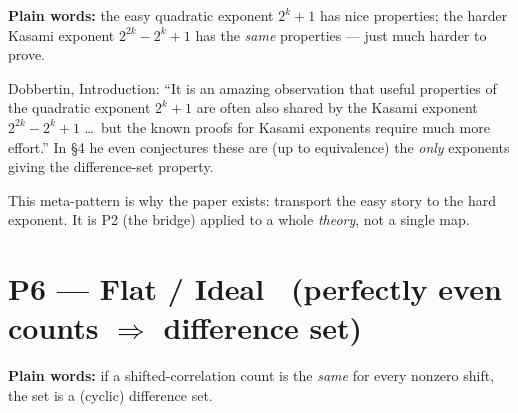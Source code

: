 \documentclass[11pt]{article}
\begin{document}
\textbf{Plain words:} the easy quadratic exponent $2^k+1$ has nice properties;
the harder Kasami exponent $2^{2k}-2^k+1$ has the \emph{same} properties --- just
much harder to prove.

\begin{center}
\end{center}

\begin{remarkbox}
Dobbertin, Introduction: ``It is an amazing observation that useful properties
of the quadratic exponent $2^k+1$ are often also shared by the Kasami exponent
$2^{2k}-2^k+1$ \dots\ but the known proofs for Kasami exponents require much more
effort.'' In {\S}4 he even conjectures these are (up to equivalence) the
\emph{only} exponents giving the difference-set property.
\end{remarkbox}

\begin{coolfact}
This meta-pattern is why the paper exists: transport the easy story to the hard
exponent. It is P2 (the bridge) applied to a whole \emph{theory}, not a single map.
\end{coolfact}

\section{P6 --- Flat / Ideal \ (perfectly even counts $\Rightarrow$ difference set)}

\textbf{Plain words:} if a shifted-correlation count is the \emph{same} for every
nonzero shift, the set is a (cyclic) difference set.
\end{document}
